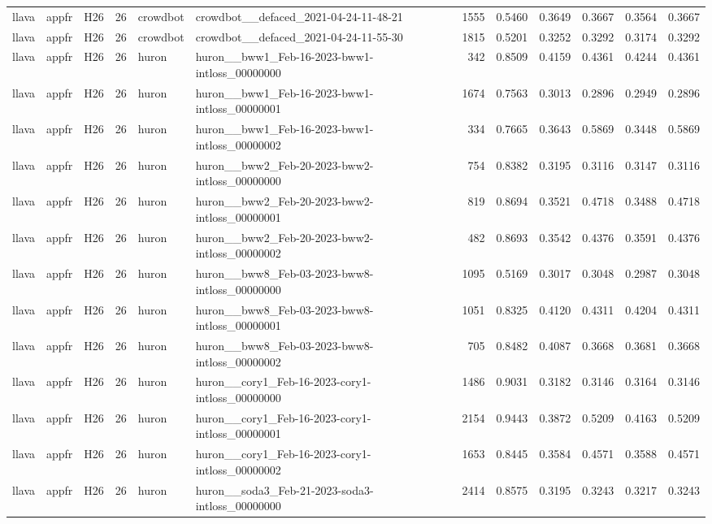 \begin{table}[tbp]
\begin{tabular}{lllrllrrrrrr}
llava & appfr & H26 & 26 & crowdbot & crowdbot\_\_defaced\_2021-04-24-11-48-21 & 1555 & 0.5460 & 0.3649 & 0.3667 & 0.3564 & 0.3667 \\
llava & appfr & H26 & 26 & crowdbot & crowdbot\_\_defaced\_2021-04-24-11-55-30 & 1815 & 0.5201 & 0.3252 & 0.3292 & 0.3174 & 0.3292 \\
llava & appfr & H26 & 26 & huron & huron\_\_bww1\_Feb-16-2023-bww1-intloss\_00000000 & 342 & 0.8509 & 0.4159 & 0.4361 & 0.4244 & 0.4361 \\
llava & appfr & H26 & 26 & huron & huron\_\_bww1\_Feb-16-2023-bww1-intloss\_00000001 & 1674 & 0.7563 & 0.3013 & 0.2896 & 0.2949 & 0.2896 \\
llava & appfr & H26 & 26 & huron & huron\_\_bww1\_Feb-16-2023-bww1-intloss\_00000002 & 334 & 0.7665 & 0.3643 & 0.5869 & 0.3448 & 0.5869 \\
llava & appfr & H26 & 26 & huron & huron\_\_bww2\_Feb-20-2023-bww2-intloss\_00000000 & 754 & 0.8382 & 0.3195 & 0.3116 & 0.3147 & 0.3116 \\
llava & appfr & H26 & 26 & huron & huron\_\_bww2\_Feb-20-2023-bww2-intloss\_00000001 & 819 & 0.8694 & 0.3521 & 0.4718 & 0.3488 & 0.4718 \\
llava & appfr & H26 & 26 & huron & huron\_\_bww2\_Feb-20-2023-bww2-intloss\_00000002 & 482 & 0.8693 & 0.3542 & 0.4376 & 0.3591 & 0.4376 \\
llava & appfr & H26 & 26 & huron & huron\_\_bww8\_Feb-03-2023-bww8-intloss\_00000000 & 1095 & 0.5169 & 0.3017 & 0.3048 & 0.2987 & 0.3048 \\
llava & appfr & H26 & 26 & huron & huron\_\_bww8\_Feb-03-2023-bww8-intloss\_00000001 & 1051 & 0.8325 & 0.4120 & 0.4311 & 0.4204 & 0.4311 \\
llava & appfr & H26 & 26 & huron & huron\_\_bww8\_Feb-03-2023-bww8-intloss\_00000002 & 705 & 0.8482 & 0.4087 & 0.3668 & 0.3681 & 0.3668 \\
llava & appfr & H26 & 26 & huron & huron\_\_cory1\_Feb-16-2023-cory1-intloss\_00000000 & 1486 & 0.9031 & 0.3182 & 0.3146 & 0.3164 & 0.3146 \\
llava & appfr & H26 & 26 & huron & huron\_\_cory1\_Feb-16-2023-cory1-intloss\_00000001 & 2154 & 0.9443 & 0.3872 & 0.5209 & 0.4163 & 0.5209 \\
llava & appfr & H26 & 26 & huron & huron\_\_cory1\_Feb-16-2023-cory1-intloss\_00000002 & 1653 & 0.8445 & 0.3584 & 0.4571 & 0.3588 & 0.4571 \\
llava & appfr & H26 & 26 & huron & huron\_\_soda3\_Feb-21-2023-soda3-intloss\_00000000 & 2414 & 0.8575 & 0.3195 & 0.3243 & 0.3217 & 0.3243 \\

\end{tabular}
\end{table}
